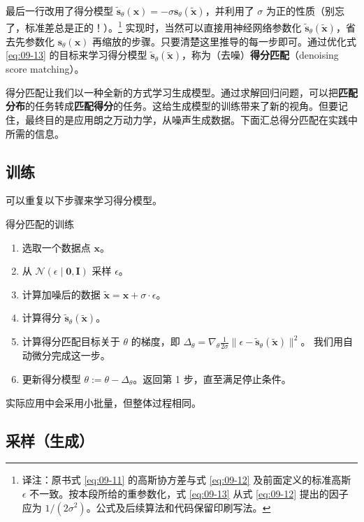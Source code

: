 最后一行改用了得分模型 $\tilde{\mathbf s}_\theta(\mathbf x)=-\sigma\mathbf s_\theta(\tilde{\mathbf x})$，并利用了 $\sigma$ 为正的性质（别忘了，标准差总是正的！）。\footnote{译注：原书式 \eqref{eq:09-11} 的高斯协方差与式 \eqref{eq:09-12} 及前面定义的标准高斯 $\epsilon$ 不一致。按本段所给的重参数化，式 \eqref{eq:09-13} 从式 \eqref{eq:09-12} 提出的因子应为 $1/(2\sigma^2)$。公式及后续算法和代码保留印刷写法。} 实现时，当然可以直接用神经网络参数化 $\tilde{\mathbf s}_\theta(\tilde{\mathbf x})$，省去先参数化 $\mathbf s_\theta(\mathbf x)$ 再缩放的步骤。只要清楚这里推导的每一步即可。通过优化式 \eqref{eq:09-13} 的目标来学习得分模型 $\tilde{\mathbf s}_\theta(\tilde{\mathbf x})$，称为（去噪）\textbf{得分匹配}（denoising score matching）。

得分匹配让我们以一种全新的方式学习生成模型。通过求解回归问题，可以把\textbf{匹配分布}的任务转成\textbf{匹配得分}的任务。这给生成模型的训练带来了新的视角。但要记住，最终目的是应用朗之万动力学，从噪声生成数据。下面汇总得分匹配在实践中所需的信息。

\subsection{训练}

可以重复以下步骤来学习得分模型。
\begin{booknote}[colframe=blue!65!black,colback=blue!4]{得分匹配的训练}
  \begin{enumerate}
    \item 选取一个数据点 $\mathbf x$。
    \item 从 $\mathcal N(\epsilon\mid\mathbf 0,\mathbf I)$ 采样 $\epsilon$。
    \item 计算加噪后的数据 $\tilde{\mathbf x}=\mathbf x+\sigma\cdot\epsilon$。
    \item 计算得分 $\tilde{\mathbf s}_\theta(\tilde{\mathbf x})$。
    \item 计算得分匹配目标关于 $\theta$ 的梯度，即
      $\Delta_\theta=\nabla_\theta\frac{1}{2\sigma}
      \lVert\epsilon-\tilde{\mathbf s}_\theta(\tilde{\mathbf x})\rVert^2$。
      我们用自动微分完成这一步。
    \item 更新得分模型 $\theta:=\theta-\Delta_\theta$。返回第 1 步，直至满足停止条件。
  \end{enumerate}
\end{booknote}
实际应用中会采用小批量，但整体过程相同。

\subsection{采样（生成）}

